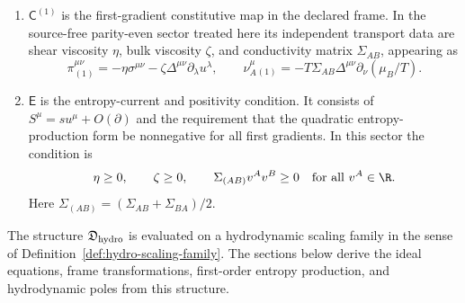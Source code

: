 \begin{definition}
\begin{enumerate}[label=\textnormal{(\roman*)}]
  \[
    T^{\mu\nu}_{(0)}=\varepsilon u^\mu u^\nu+p\Delta^{\mu\nu},
    \qquad
    J^\mu_{A(0)}=n_Au^\mu,
    \qquad
    \Delta^{\mu\nu}=\eta^{\mu\nu}+u^\mu u^\nu .
  \]
  The thermodynamic functions obey
  \(dp=s\,dT+n_A\,d\mu_A\) and
  \(\varepsilon+p=Ts+\mu_A n_A\).
\item \(\mathsf C^{(1)}\) is the first-gradient constitutive map in the
  declared frame.  In the source-free parity-even sector treated here its
  independent transport data are shear viscosity \(\eta\), bulk viscosity
  \(\zeta\), and conductivity matrix \(\Sigma_{AB}\), appearing as
  \[
    \pi^{\mu\nu}_{(1)}=-\eta\sigma^{\mu\nu}
    -\zeta\Delta^{\mu\nu}\partial_\lambda u^\lambda,
    \qquad
    \nu_A^\mu{}_{(1)}
    =
    -T\Sigma_{AB}\Delta^{\mu\nu}\partial_\nu(\mu_B/T).
  \]
\item \(\mathsf E\) is the entropy-current and positivity condition.  It consists
  of \(S^\mu=su^\mu+O(\partial)\) and the requirement that the quadratic
  entropy-production form be nonnegative for all first gradients.  In this
  sector the condition is
  \[
    \eta\ge0,\qquad \zeta\ge0,\qquad
    \Sigma_{(AB)}v^Av^B\ge0
    \quad\text{for all }v^A\in\R .
  \]
  Here \(\Sigma_{(AB)}=(\Sigma_{AB}+\Sigma_{BA})/2\).
\end{enumerate}
The structure \(\mathfrak D_{\rm hydro}\) is evaluated on a hydrodynamic scaling
family in the sense of Definition~\ref{def:hydro-scaling-family}.  The
sections below derive the ideal equations, frame transformations, first-order
entropy production, and hydrodynamic poles from this structure.
\end{definition}

